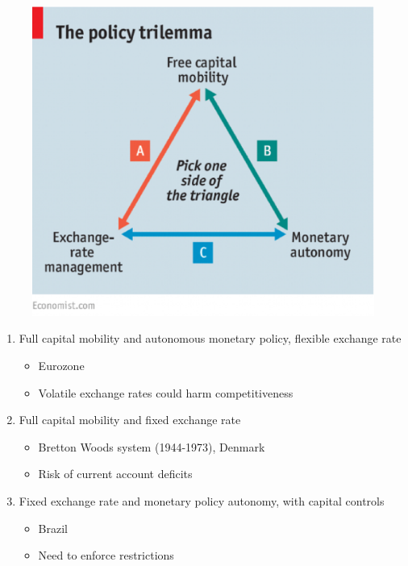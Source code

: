 \documentclass{beamer}
\begin{document}
\begin{frame}
  \begin{figure}
    \includegraphics[scale=.4]{impossible_trinity.eps}
  \end{figure}
\end{frame}



\begin{frame}
  \begin{enumerate}
    \item Full capital mobility and autonomous monetary policy, flexible exchange rate
    \begin{itemize}
      \item Eurozone
      \item Volatile exchange rates could harm competitiveness
    \end{itemize}
    \medskip
    \item Full capital mobility and fixed exchange rate
    \begin{itemize}
      \item Bretton Woods system (1944-1973), Denmark
      \item Risk of current account deficits
    \end{itemize}
    \medskip
    \item Fixed exchange rate and monetary policy autonomy, with capital controls
    \begin{itemize}
      \item Brazil
      \item Need to enforce restrictions
    \end{itemize}
  \end{enumerate}
\end{frame}
\end{document}
